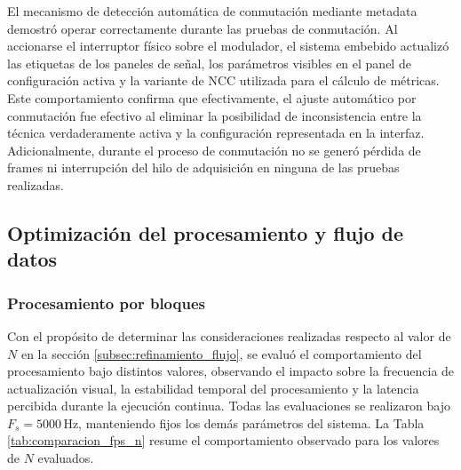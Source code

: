 El mecanismo de detección automática de conmutación mediante metadata demostró operar correctamente durante las pruebas de conmutación. Al accionarse el interruptor físico sobre el modulador, el sistema embebido actualizó las etiquetas de los paneles de señal, los parámetros visibles en el panel de configuración activa y la variante de NCC utilizada para el cálculo de métricas. Este comportamiento confirma que efectivamente, el ajuste automático por conmutación fue efectivo al eliminar la posibilidad de inconsistencia entre la técnica verdaderamente activa y la configuración representada en la interfaz. Adicionalmente, durante el proceso de conmutación no se generó pérdida de frames ni interrupción del hilo de adquisición en ninguna de las pruebas realizadas.


\subsection{Optimización del procesamiento y flujo de datos}

\subsubsection{Procesamiento por bloques}

Con el propósito de determinar las consideraciones realizadas respecto al valor de $N$ en la sección \ref{subsec:refinamiento_flujo}, se evaluó el comportamiento del procesamiento bajo distintos valores, observando el impacto sobre la frecuencia de actualización visual, la estabilidad temporal del procesamiento y la latencia percibida durante la ejecución continua. Todas las evaluaciones se realizaron bajo $F_s = 5000\,\text{Hz}$, manteniendo fijos los demás parámetros del sistema. La Tabla \ref{tab:comparacion_fps_n} resume el comportamiento observado para los valores de $N$ evaluados.

